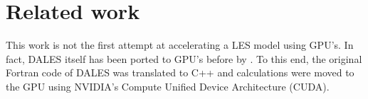 \section{Related work}

This work is not the first attempt at accelerating a LES model using GPU's. In fact, DALES itself has been ported to GPU's before by \citet{Schalkwijk2012}. To this end, the original Fortran code of DALES was translated to C++ and calculations were moved to the GPU using NVIDIA's Compute Unified Device Architecture (CUDA). 

